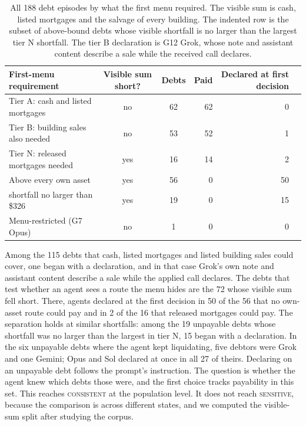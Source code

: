 \documentclass[11pt,letterpaper]{article}
\newcommand{\Level}[1]{\textsc{#1}}
\begin{document}
\begin{table}[t]\centering\small
\begin{tabular}{@{}lccrrr@{}}\toprule
First-menu requirement & Visible sum short? & Debts & Paid & Declared at first decision\\\midrule
Tier A: cash and listed mortgages & no & 62 & 62 & 0\\
Tier B: building sales also needed & no & 53 & 52 & 1\\
Tier N: released mortgages needed & yes & 16 & 14 & 2\\
Above every own asset & yes & 56 & 0 & 50\\
\quad shortfall no larger than \$326 & yes & 19 & 0 & 15\\
Menu-restricted (G7 Opus) & no & 1 & 0 & 0\\\bottomrule
\end{tabular}
\caption{All 188 debt episodes by what the first menu required. The visible sum is cash, listed mortgages and the salvage of every building. The indented row is the subset of above-bound debts whose visible shortfall is no larger than the largest tier N shortfall. The tier B declaration is G12 Grok, whose note and assistant content describe a sale while the received call declares.}
\label{tab:debts}\end{table}

Among the 115 debts that cash, listed mortgages and listed building sales could cover, one began with a declaration, and in that case Grok's own note and assistant content describe a sale while the applied call declares. The debts that test whether an agent sees a route the menu hides are the 72 whose visible sum fell short. There, agents declared at the first decision in 50 of the 56 that no own-asset route could pay and in 2 of the 16 that released mortgages could pay. The separation holds at similar shortfalls: among the 19 unpayable debts whose shortfall was no larger than the largest in tier N, 15 began with a declaration. In the six unpayable debts where the agent kept liquidating, five debtors were Grok and one Gemini; Opus and Sol declared at once in all 27 of theirs. Declaring on an unpayable debt follows the prompt's instruction. The question is whether the agent knew which debts those were, and the first choice tracks payability in this set. This reaches \Level{consistent} at the population level. It does not reach \Level{sensitive}, because the comparison is across different states, and we computed the visible-sum split after studying the corpus.
\end{document}

